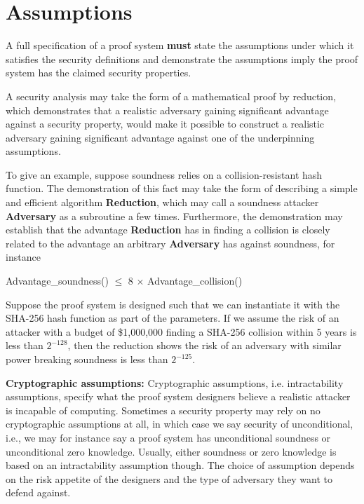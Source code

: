 \section{Assumptions}
\label{security:assumptions}
 
A full specification of a proof system \textbf{must} state the assumptions under which it satisfies the security definitions and demonstrate the assumptions imply the proof system has the claimed security properties.
 
A security analysis may take the form of a mathematical proof by reduction, which demonstrates that a realistic adversary gaining significant advantage against a security property, would make it possible to construct a realistic adversary gaining significant advantage against one of the underpinning assumptions.
 
To give an example, suppose soundness relies on a collision-resistant hash function. The demonstration of this fact may take the form of describing a simple and efficient algorithm \textbf{Reduction}, which may call a soundness attacker \textbf{Adversary} as a subroutine a few times. Furthermore, the demonstration may establish that the advantage \textbf{Reduction} has in finding a collision is closely related to the advantage an arbitrary \textbf{Adversary} has against soundness, for instance

Advantage\_soundness(\params) $\leq$ 8 $\times$ Advantage\_collision(\params)
 
Suppose the proof system is designed such that we can instantiate it with the SHA-256 hash function as part of the parameters.
If we assume the risk of an attacker with a budget of \$1,000,000 finding a SHA-256 collision within 5 years is less than $2^{-128}$, then the reduction shows the risk of an adversary with similar power breaking soundness is less than $2^{-125}$.
 
\textbf{Cryptographic assumptions:} Cryptographic assumptions, i.e. intractability assumptions, specify what the proof system designers believe a realistic attacker is incapable of computing.
Sometimes a security property may rely on no cryptographic assumptions at all, in which case we say security of unconditional, i.e., we may for instance say a proof system has unconditional soundness or unconditional zero knowledge. Usually, either soundness or zero knowledge is based on an intractability assumption though.
The choice of assumption depends on the risk appetite of the designers and the type of adversary they want to defend against.
 
